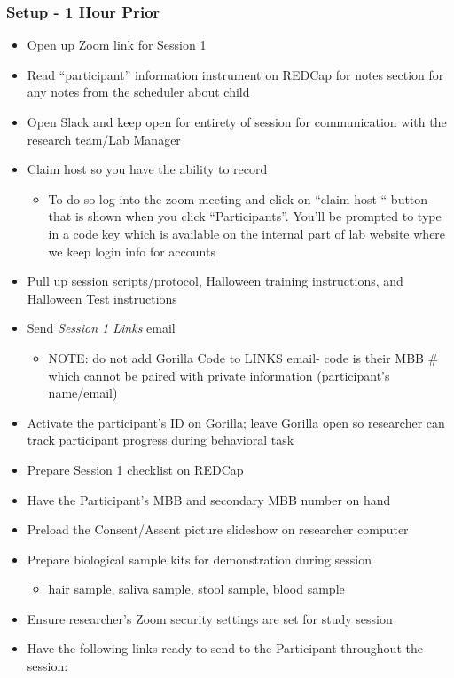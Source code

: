 \documentclass[]{book}
\providecommand{\tightlist}{%
  \setlength{\itemsep}{0pt}\setlength{\parskip}{0pt}}
\begin{document}
\hypertarget{setup---1-hour-prior-1}{%
\subsubsection{Setup - 1 Hour Prior}\label{setup---1-hour-prior-1}}

\begin{itemize}
\tightlist
\item
  Open up Zoom link for Session 1
\item
  Read ``participant'' information instrument on REDCap for notes section for any notes from the scheduler about child
\item
  Open Slack and keep open for entirety of session for communication with the research team/Lab Manager
\item
  Claim host so you have the ability to record

  \begin{itemize}
  \tightlist
  \item
    To do so log into the zoom meeting and click on ``claim host `` button that is shown when you click ``Participants''. You'll be prompted to type in a code key which is available on the internal part of lab website where we keep login info for accounts
  \end{itemize}
\item
  Pull up session scripts/protocol, Halloween training instructions, and Halloween Test instructions
\item
  Send \emph{Session 1 Links} email

  \begin{itemize}
  \tightlist
  \item
    NOTE: do not add Gorilla Code to LINKS email- code is their MBB \# which cannot be paired with private information (participant's name/email)
  \end{itemize}
\item
  Activate the participant's ID on Gorilla; leave Gorilla open so researcher can track participant progress during behavioral task
\item
  Prepare Session 1 checklist on REDCap
\item
  Have the Participant's MBB and secondary MBB number on hand
\item
  Preload the Consent/Assent picture slideshow on researcher computer
\item
  Prepare biological sample kits for demonstration during session

  \begin{itemize}
  \tightlist
  \item
    hair sample, saliva sample, stool sample, blood sample\\
  \end{itemize}
\item
  Ensure researcher's Zoom security settings are set for study session
\item
  Have the following links ready to send to the Participant throughout the session:


\end{itemize}
\end{document}
